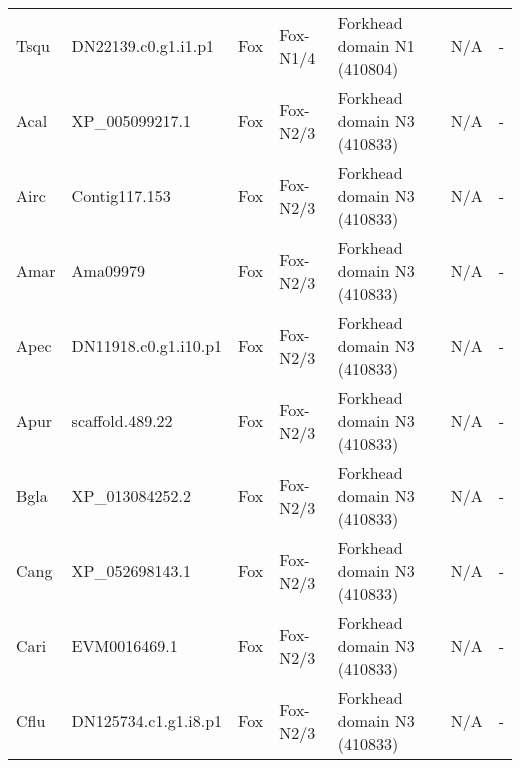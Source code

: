 \documentclass[../main.tex]{subfiles}
\begin{document}
\begin{landscape}
\begin{longtable}{lllllll}
		Tsqu           & DN22139.c0.g1.i1.p1   & Fox            & Fox-N1/4            & Forkhead domain N1 (410804)                 & N/A                                                                    & -                    \\
		Acal           & XP\_005099217.1       & Fox            & Fox-N2/3            & Forkhead domain N3 (410833)                 & N/A                                                                    & -                    \\
		Airc           & Contig117.153         & Fox            & Fox-N2/3            & Forkhead domain N3 (410833)                 & N/A                                                                    & -                    \\
		Amar           & Ama09979              & Fox            & Fox-N2/3            & Forkhead domain N3 (410833)                 & N/A                                                                    & -                    \\
		Apec           & DN11918.c0.g1.i10.p1  & Fox            & Fox-N2/3            & Forkhead domain N3 (410833)                 & N/A                                                                    & -                    \\
		Apur           & scaffold.489.22       & Fox            & Fox-N2/3            & Forkhead domain N3 (410833)                 & N/A                                                                    & -                    \\
		Bgla           & XP\_013084252.2       & Fox            & Fox-N2/3            & Forkhead domain N3 (410833)                 & N/A                                                                    & -                    \\
		Cang           & XP\_052698143.1       & Fox            & Fox-N2/3            & Forkhead domain N3 (410833)                 & N/A                                                                    & -                    \\
		Cari           & EVM0016469.1          & Fox            & Fox-N2/3            & Forkhead domain N3 (410833)                 & N/A                                                                    & -                    \\
		Cflu           & DN125734.c1.g1.i8.p1  & Fox            & Fox-N2/3            & Forkhead domain N3 (410833)                 & N/A                                                                    & -                    \\

\end{longtable}
\end{landscape}
\end{document}
